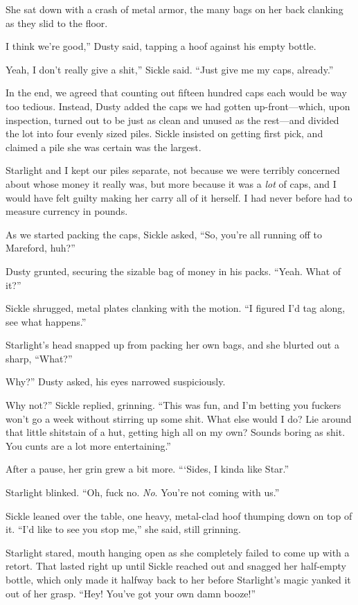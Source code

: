 She sat down with a crash of metal armor, the many bags on her back clanking as they slid to the floor.

\leavevmode{}I think we’re good,” Dusty said, tapping a hoof against his empty bottle.

\leavevmode{}Yeah, I don’t really give a shit,” Sickle said. “Just give me my caps, already.”

In the end, we agreed that counting out fifteen hundred caps each would be way too tedious. Instead, Dusty added the caps we had gotten up-front—which, upon inspection, turned out to be just as clean and unused as the rest—and divided the lot into four evenly sized piles. Sickle insisted on getting first pick, and claimed a pile she was certain was the largest.

Starlight and I kept our piles separate, not because we were terribly concerned about whose money it really was, but more because it was a \textit{lot} of caps, and I would have felt guilty making her carry all of it herself. I had never before had to measure currency in pounds.

As we started packing the caps, Sickle asked, “So, you’re all running off to Mareford, huh?”

Dusty grunted, securing the sizable bag of money in his packs. “Yeah. What of it?”

Sickle shrugged, metal plates clanking with the motion. “I figured I’d tag along, see what happens.”

Starlight’s head snapped up from packing her own bags, and she blurted out a sharp, “What?”

\leavevmode{}Why?” Dusty asked, his eyes narrowed suspiciously.

\leavevmode{}Why not?” Sickle replied, grinning. “This was fun, and I’m betting you fuckers won’t go a week without stirring up some shit. What else would I do? Lie around that little shitstain of a hut, getting high all on my own? Sounds boring as shit. You cunts are a lot more entertaining.”

After a pause, her grin grew a bit more. “‘Sides, I kinda like Star.”

Starlight blinked. “Oh, fuck no. \textit{No}. You’re not coming with us.”

Sickle leaned over the table, one heavy, metal-clad hoof thumping down on top of it. “I’d like to see you stop me,” she said, still grinning.

Starlight stared, mouth hanging open as she completely failed to come up with a retort. That lasted right up until Sickle reached out and snagged her half-empty bottle, which only made it halfway back to her before Starlight’s magic yanked it out of her grasp. “Hey! You’ve got your own damn booze!”

